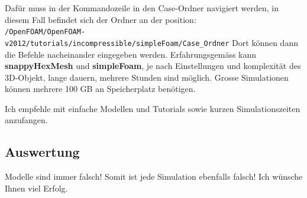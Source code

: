 Dafür muss in der Kommandozeile in den Case-Ordner navigiert werden, in diesem Fall befindet sich der Ordner an der position:\\
\texttt{/OpenFOAM/OpenFOAM-v2012/tutorials/incompressible/simpleFoam/Case\_Ordner}
Dort können dann die Befehle nacheinander eingegeben werden.
Erfahrungsgemäss kann \textbf{snappyHexMesh} und \textbf{simpleFoam}, je nach Einstellungen und komplexität des 3D-Objekt, 
lange dauern, mehrere Stunden sind möglich.
Grosse Simulationen können mehrere 100 GB an Speicherplatz benötigen.

Ich empfehle mit einfache Modellen und Tutorials sowie kurzen Simulationszeiten anzufangen.

\subsection{Auswertung \label{openfoam:section:Auswertung}}
\begin{center}
        Modelle sind immer falsch! Somit ist jede Simulation ebenfalls falsch!
        Ich wünsche Ihnen viel Erfolg.
\end{center}
